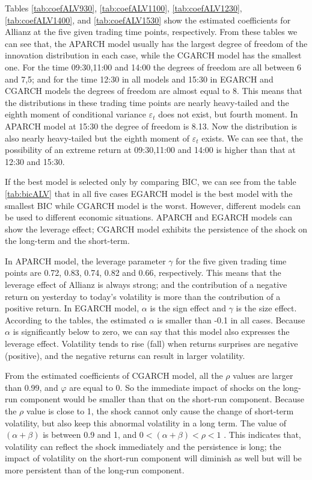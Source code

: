 Tables \ref{tab:coefALV930}, \ref{tab:coefALV1100}, \ref{tab:coefALV1230}, \ref{tab:coefALV1400}, and \ref{tab:coefALV1530} show the estimated coefficients for Allianz at the five given trading time points, respectively. From these tables we can see that, the APARCH model usually has the largest degree of freedom of the innovation distribution in each case, while the CGARCH model has the smallest one. For the time 09:30,11:00 and 14:00 the degrees of freedom are all between 6 and 7,5; and for the time 12:30 in all models and 15:30 in EGARCH and CGARCH models the degrees of freedom are almost equal to 8. This means that the distributions in these trading time points are nearly heavy-tailed and the eighth moment of conditional variance $\varepsilon_t$  does not exist, but fourth moment. In APARCH model at 15:30 the degree of freedom is 8.13. Now the distribution is also nearly heavy-tailed but the eighth moment of  $\varepsilon_t$ exists. We can see that, the possibility of an extreme return at 09:30,11:00 and 14:00 is higher than that at 12:30 and 15:30.

If the best model is selected only by comparing BIC, we can see from the table \ref{tab:bicALV} that in all five cases EGARCH model is the best model with the smallest BIC while CGARCH model is the worst. However, different models can be used to different economic situations. APARCH and EGARCH models can show the leverage effect; CGARCH model exhibits the persistence of the shock on the long-term and the short-term.

In APARCH model, the leverage parameter $\gamma$  for the five given trading time points are 0.72, 0.83, 0.74, 0.82 and 0.66, respectively. This means that the leverage effect of Allianz is always strong; and the contribution of a negative return on yesterday to today’s volatility is more than the contribution of a positive return. In EGARCH model,  $\alpha$ is the sign effect and $\gamma$  is the size effect. According to the tables, the estimated $\alpha$ is smaller than -0.1 in all cases. Because $\alpha$  is significantly below to zero, we can say that this model also expresses the leverage effect. Volatility tends to rise (fall) when returns surprises are negative (positive), and the negative returns can result in larger volatility.

From the estimated coefficients of CGARCH model, all the $\rho$  values are larger than 0.99, and $\varphi$  are equal to 0. So the immediate impact of shocks on the long-run component would be smaller than that on the short-run component. Because the $\rho$  value is close to 1, the shock cannot only cause the change of short-term volatility, but also keep this abnormal volatility in a long term. The value of $(\alpha + \beta)$  is between 0.9 and 1, and $0 < (\alpha + \beta) < \rho <1$ . This indicates that, volatility can reflect the shock immediately and the persistence is long; the impact of volatility on the short-run component will diminish as well but will be more persistent than of the long-run component.

